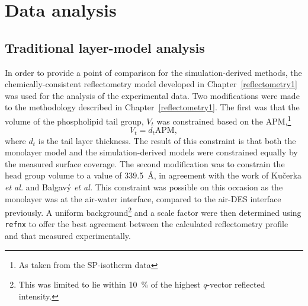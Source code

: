 \section{Data analysis}
\subsection{Traditional layer-model analysis}
In order to provide a point of comparison for the simulation-derived methods, the chemically-consistent reflectometry model developed in Chapter~\ref{reflectometry1} was used for the analysis of the experimental data.
Two modifications were made to the methodology described in Chapter~\ref{reflectometry1}.
The first was that the volume of the phospholipid tail group, $V_t$ was constrained based on the APM,\footnote{As taken from the SP-isotherm data}
%
\begin{equation}
V_t = d_t\text{APM},
\end{equation}
%
where $d_t$ is the tail layer thickness.
The result of this constraint is that both the monolayer model and the simulation-derived models were constrained equally by the measured surface coverage.
The second modification was to constrain the head group volume to a value of \SI{339.5}{\angstrom}, in agreement with the work of Ku\v{c}erka \emph{et al.}\autocite{kucerka_determination_2004} and Balgav\'{y} \emph{et al.}\autocite{balgavy_evaluation_2001}
This constraint was possible on this occasion as the monolayer was at the air-water interface, compared to the air-DES interface previously.
A uniform background\footnote{This was limited to lie within \SI{10}{\percent} of the highest $q$-vector reflected intensity.} and a scale factor were then determined using \texttt{refnx} to offer the best agreement between the calculated reflectometry profile and that measured experimentally.

